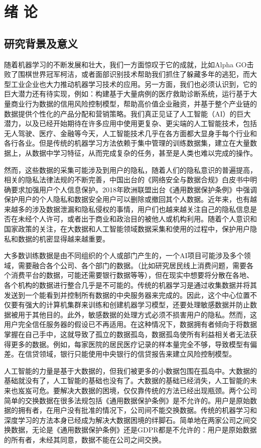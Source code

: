 \chapter{绪\hskip 0.4cm 论}
\label{ch1}

\section{研究背景及意义}
随着机器学习的不断发展和壮大，我们一方面惊叹于它的成就，比如Alpha GO击败了围棋世界冠军柯洁，或者面部识别技术帮助我们抓住了躲藏多年的逃犯，而大型工业企业也大力推动机器学习技术的应用。另一方面，我们也必须认识到，它的巨大潜力还有待实现，例如：构建基于大量病例的医疗救助诊断系统，运行基于大量商业行为数据的信用风险控制模型，帮助高价值企业融资，并基于整个产业链的数据提供个性化的产品分配和营销策略。我们真正见证了人工智能（AI）的巨大潜力，以及已经开始期待在许多应用中使用更复杂、更尖端的人工智能技术，包括无人驾驶、医疗、金融等今天，人工智能技术几乎在各方面都大显身手每个行业和各行各业。但是传统的机器学习方法依赖于集中管理的训练数据集，建立在大量数据上，从数据中学习特征，从而完成复杂的任务，甚至是人类也难以完成的操作。

然而，这些数据的采集可能涉及到用户的隐私，随着人们的隐私意识的普遍提高，相关的隐私法律法规的不断完善，中国出台的《网络安全与数据合规》白皮书中明确要求加强用户个人信息保护。2018年欧洲联盟出台《通用数据保护条例》中强调保护用户的个人隐私和数据安全用户可以删除或撤回其个人数据。近年来，也有越来越多的涉及数据泄漏和隐私侵权的事情，用户们也越来越关注自己的隐私信息是否在未经个人许可，或者出于商业和政治目的被他人或机构利用。随着个人意识和国家政策的关注，在大数据和人工智能领域数据采集和使用的过程中，保护用户隐私和数据的机密显得越来越重要。

大多数训练数据是由不同组织的个人或部门产生的，一个AI项目可能涉及多个领域，需要融合各个公司、各个部门的数据。（比如研究居民线上消费问题，需要各个消费平台的数据，可能还需要银行数据等等），但在现实中想要将分散在各地、各个机构的数据进行整合几乎是不可能的。传统的机器学习是通过收集数据并将其发送到一个能看到并控制所有数据的中央服务器来完成的。因此，这个中心位置不仅要有强大的计算机集群来训练和创建机器学习模型，还要处理敏感数据并防止数据被用于其他目的。此外，敏感数据的处理方式必须不损害用户的隐私。然而，这用户完全信任服务器的假设已不再适用。在这种情况下，数据拥有者倾向于将数据掌握在自己手中，这就导致了孤立的数据孤岛，数据孤岛使所有利益相关者无法获得更多的数据。例如，每家医院的居民医疗记录的样本量完全不够，导致模型有偏差。在信贷领域，银行只能使用中央银行的信贷报告来建立风险控制模型。

人工智能的力量是基于大数据的，但我们被更多的小数据包围在孤岛中。大数据的基础就没有了，人工智能的基础也没有了。大数据的基础已经消失，人工智能的未来也岌岌可危。要解决大数据的困境，仅仅靠传统的方法已经出现瓶颈。两个公司简单的交换数据在很多法规包括《通用数据保护条例》是不允许的。用户是原始数据的拥有者，在用户没有批准的情况下，公司间不能交换数据。传统的机器学习和深度学习的方法本身已经成为解决大数据困境的绊脚石。简单地在两家公司之间交换数据，无论是《通用数据保护条例》还是GDPR都是不允许的：用户是原始数据的所有者，未经其同意，数据不能在公司之间交换。

